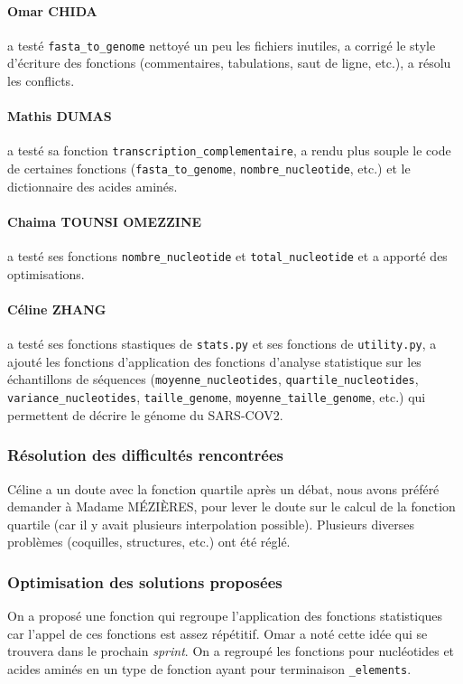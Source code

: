 \paragraph*{Omar CHIDA} a testé \texttt{fasta\_to\_genome} nettoyé un peu les fichiers inutiles, a corrigé le style d'écriture des fonctions (commentaires, tabulations, saut de ligne, etc.), a résolu les conflicts.

\paragraph*{Mathis DUMAS} a testé sa fonction \texttt{transcription\_complementaire}, a rendu plus souple le code de certaines fonctions (\texttt{fasta\_to\_genome}, \texttt{nombre\_nucleotide}, etc.) et le dictionnaire des acides aminés.

\paragraph*{Chaima TOUNSI OMEZZINE} a testé ses fonctions \texttt{nombre\_nucleotide} et \texttt{total\_nucleotide} et a apporté des optimisations.

\paragraph*{Céline ZHANG} a testé ses fonctions stastiques de \texttt{stats.py} et ses fonctions de \texttt{utility.py}, a ajouté les fonctions d'application des fonctions d'analyse statistique sur les échantillons de séquences (\texttt{moyenne\_nucleotides}, \texttt{quartile\_nucleotides}, \texttt{variance\_nucleotides}, \texttt{taille\_genome}, \texttt{moyenne\_taille\_genome}, etc.) qui permettent de décrire le génome du SARS-COV2.

\subsubsection*{Résolution des difficultés rencontrées}
Céline a un doute avec la fonction quartile après un débat, nous avons préféré demander à Madame MÉZIÈRES, pour lever le doute sur le calcul de la fonction quartile (car il y avait plusieurs interpolation possible). Plusieurs diverses problèmes (coquilles, structures, etc.) ont été réglé.

\subsubsection*{Optimisation des solutions proposées}
On a proposé une fonction qui regroupe l'application des fonctions statistiques car l'appel de ces fonctions est assez répétitif. Omar a noté cette idée qui se trouvera dans le prochain \textsl{sprint}. On a regroupé les fonctions pour nucléotides et acides aminés en un type de fonction ayant pour terminaison \texttt{\_elements}.

